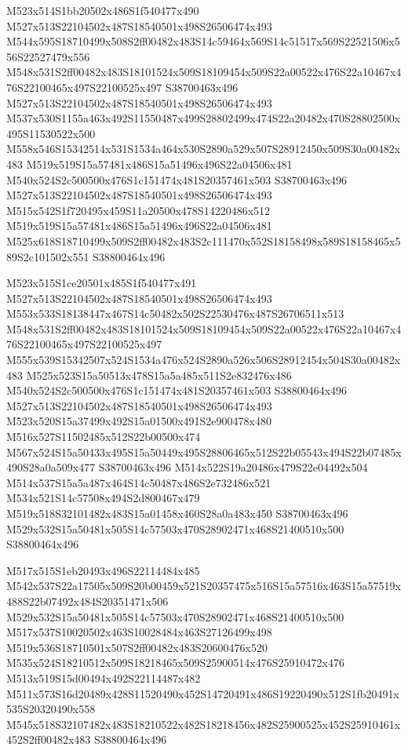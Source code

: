 \documentclass{article}
\begin{document}
\begin{multicols}{2}
M523x514S1bb20502x486S1f540477x490 M527x513S22104502x487S18540501x498S26506474x493 M544x595S18710499x508S2ff00482x483S14c59464x569S14c51517x569S22521506x556S22527479x556 M548x531S2ff00482x483S18101524x509S18109454x509S22a00522x476S22a10467x476S22100465x497S22100525x497 S38700463x496 M527x513S22104502x487S18540501x498S26506474x493 M537x530S1155a463x492S11550487x499S28802499x474S22a20482x470S28802500x495S11530522x500 M558x546S15342514x531S1534a464x530S2890a529x507S28912450x509S30a00482x483 M519x519S15a57481x486S15a51496x496S22a04506x481 M540x524S2c500500x476S1c151474x481S20357461x503 S38700463x496 M527x513S22104502x487S18540501x498S26506474x493 M515x542S1f720495x459S11a20500x478S14220486x512 M519x519S15a57481x486S15a51496x496S22a04506x481 M525x618S18710499x509S2ff00482x483S2c111470x552S18158498x589S18158465x589S2c101502x551 S38800464x496

M523x515S1ce20501x485S1f540477x491 M527x513S22104502x487S18540501x498S26506474x493 M553x533S18138447x467S14c50482x502S22530476x487S26706511x513 M548x531S2ff00482x483S18101524x509S18109454x509S22a00522x476S22a10467x476S22100465x497S22100525x497 M555x539S15342507x524S1534a476x524S2890a526x506S28912454x504S30a00482x483 M525x523S15a50513x478S15a5a485x511S2e832476x486 M540x524S2c500500x476S1c151474x481S20357461x503 S38800464x496 M527x513S22104502x487S18540501x498S26506474x493 M523x520S15a37499x492S15a01500x491S2e900478x480 M516x527S11502485x512S22b00500x474 M567x524S15a50433x495S15a50449x495S28806465x512S22b05543x494S22b07485x490S28a0a509x477 S38700463x496 M514x522S19a20486x479S22e04492x504 M514x537S15a5a487x464S14c50487x486S2e732486x521 M534x521S14c57508x494S2d800467x479 M519x518S32101482x483S15a01458x460S28a0a483x450 S38700463x496 M529x532S15a50481x505S14c57503x470S28902471x468S21400510x500 S38800464x496

M517x515S1eb20493x496S22114484x485 M542x537S22a17505x509S20b00459x521S20357475x516S15a57516x463S15a57519x488S22b07492x484S20351471x506 M529x532S15a50481x505S14c57503x470S28902471x468S21400510x500 M517x537S10020502x463S10028484x463S27126499x498 M519x536S18710501x507S2ff00482x483S20600476x520 M535x524S18210512x509S18218465x509S25900514x476S25910472x476 M513x519S15d00494x492S22114487x482 M511x573S16d20489x428S11520490x452S14720491x486S19220490x512S1fb20491x535S20320490x558 M545x518S32107482x483S18210522x482S18218456x482S25900525x452S25910461x452S2ff00482x483 S38800464x496


\end{multicols}
\end{document}
